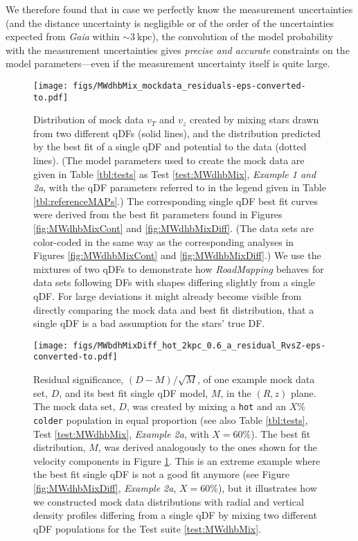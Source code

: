 \documentclass[iop,revtex4,numberedappendix,appendixfloats]{emulateapj}
\newcommand{\RM}{{\sl RoadMapping}}
\begin{document}
We therefore found that in case we perfectly know the measurement uncertainties (and the distance uncertainty is negligible or of the order of the uncertainties expected from \emph{Gaia} within $\sim3~\text{kpc}$), the convolution of the model probability with the measurement uncertainties gives \emph{precise and accurate} constraints on the model parameters---even if the measurement uncertainty itself is quite large.

\begin{figure}[!htbp]
\centering
\texttt{[image: figs/MWdhbMix\_mockdata\_residuals-eps-converted-to.pdf]}
\caption{Distribution of mock data $v_T$ and $v_z$ created by mixing stars drawn from two different qDFs (solid lines), and the distribution predicted by the best fit of a single qDF and potential to the data (dotted lines). (The model parameters used to create the mock data are given in Table \ref{tbl:tests} as Test \ref{test:MWdhbMix}, \emph{Example 1 and 2a}, with the qDF parameters referred to in the legend given in Table \ref{tbl:referenceMAPs}.) The corresponding single qDF best fit curves were derived from the best fit parameters found in Figures \ref{fig:MWdhbMixCont} and \ref{fig:MWdhbMixDiff}. (The data sets are color-coded in the same way as the corresponding analyses in Figures \ref{fig:MWdhbMixCont} and \ref{fig:MWdhbMixDiff}.) We use the mixtures of two qDFs to demonstrate how \RM{} behaves for data sets following DFs with shapes differing slightly from a single qDF. For large deviations it might already become visible from directly comparing the mock data and best fit distribution, that a single qDF is a bad assumption for the stars' true DF.}
\label{fig:MWdhbMix_mockdata_residuals}
\end{figure}

\begin{figure}[!htbp]
\centering
\texttt{[image: figs/MWbdhMixDiff\_hot\_2kpc\_0.6\_a\_residual\_RvsZ-eps-converted-to.pdf]}
\caption{Residual significance, $(D-M)/\sqrt{M}$, of one example mock data set, $D$, and its best fit single qDF model, $M$, in the $(R,z)$ plane. The mock data set, $D$, was created by mixing a \texttt{hot} and an $X\%$ \texttt{colder} population in equal proportion (see also Table \ref{tbl:tests}, Test \ref{test:MWdhbMix}, \emph{Example 2a}, with $X=60\%$). The best fit distribution, $M$, was derived analogously to the ones shown for the velocity components in Figure \ref{fig:MWdhbMix_mockdata_residuals}. This is an extreme example where the best fit single qDF is not a good fit anymore (see Figure \ref{fig:MWdhbMixDiff}, \emph{Example 2a}, $X=60\%$), but it illustrates how we constructed mock data distributions with radial and vertical density profiles differing from a single qDF by mixing two different qDF populations for the Test suite \ref{test:MWdhbMix}.}
\label{fig:MWbdhMix_residual_RvsZ}
\end{figure}
\end{document}
